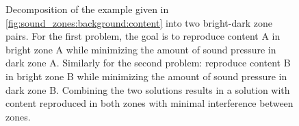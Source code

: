 \begin{figure}[]
    \centering
    \begin{subfigure}{0.49\linewidth}
        \centering
        \scalebox{0.9}{}
    \end{subfigure}
    \begin{subfigure}{0.49\linewidth}
        \centering
        \scalebox{0.9}{}
    \end{subfigure}
    \caption{Decomposition of the example given in \autoref{fig:sound_zones:background:content} into 
        two bright-dark zone pairs.
        For the first problem, the goal is to reproduce content A in bright zone A while minimizing 
        the amount of sound pressure in dark zone A.
        Similarly for the second problem: reproduce content B in bright zone B while minimizing the 
        amount of sound pressure in dark zone B.
        Combining the two solutions results in a solution with content reproduced in both zones with 
        minimal interference between zones.}
    \label{fig:sound_zones:background:bright_dark_example}
\end{figure}




